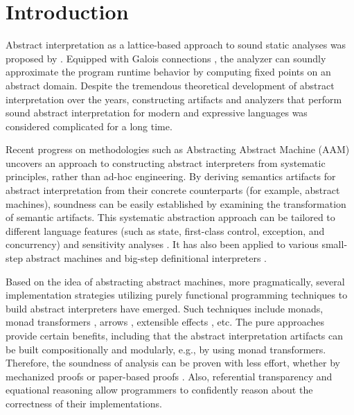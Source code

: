 \section{Introduction} \label{intro}

Abstract interpretation as a lattice-based approach to sound static
analyses was proposed by \citet{DBLP:conf/popl/CousotC77}. Equipped
with Galois connections \cite{CousotCousot79-1}, the analyzer can
soundly approximate the program runtime behavior by computing fixed
points on an abstract domain. Despite the tremendous theoretical
development of abstract interpretation over the years, constructing
artifacts and analyzers that perform sound abstract interpretation for
modern and expressive languages was considered complicated for a long
time.

Recent progress on methodologies such as Abstracting Abstract
Machine (AAM) \cite{DBLP:journals/jfp/HornM12, DBLP:conf/icfp/HornM10}
uncovers an approach to constructing abstract interpreters from
systematic principles, rather than ad-hoc engineering.  By deriving
semantics artifacts for abstract interpretation from their concrete
counterparts (for example, abstract machines), soundness can be
easily established by examining the transformation of semantic
artifacts.
This systematic abstraction approach can be tailored to different
language features (such as state, first-class control, exception, and
concurrency) and sensitivity analyses \cite{DBLP:conf/icfp/Gilray0M16,
  DBLP:conf/popl/GilrayL0MH16, Darais:2015:GTM:2814270.2814308}. It
has also been applied to various small-step abstract machines
\cite{DBLP:journals/jfp/HornM12, DBLP:conf/icfp/HornM10,
  Sergey:2013:MAI:2491956.2491979} and big-step definitional
interpreters \cite{Wei:2018:RAA:3243631.3236800,
  DBLP:journals/pacmpl/DaraisLNH17, Keidel:2018:CSP:3243631.3236767}.

Based on the idea of abstracting abstract machines, more
pragmatically, several implementation strategies utilizing purely
functional programming techniques to build abstract interpreters have
emerged. Such techniques include monads, monad transformers
\cite{DBLP:journals/pacmpl/DaraisLNH17,
  Sergey:2013:MAI:2491956.2491979}, arrows
\cite{Keidel:2018:CSP:3243631.3236767}, extensible effects
\cite{Kiselyov:2015:FMM:2804302.2804319}, etc. The pure approaches provide certain
benefits, including that the abstract interpretation artifacts can be
built compositionally and modularly, e.g., by using monad
transformers. Therefore, the soundness of analysis can be proven with
less effort, whether by mechanized proofs
\cite{Darais:2016:CGC:2951913.2951934} or paper-based proofs
\cite{Keidel:2018:CSP:3243631.3236767}.  Also, referential
transparency and equational reasoning allow programmers to
confidently reason about the correctness of their implementations.

